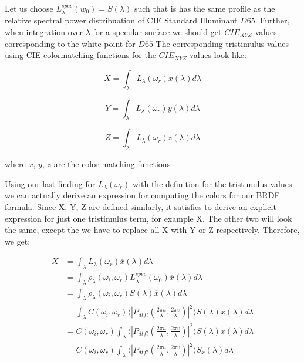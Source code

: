 Let us choose $L_\lambda^{spec}(w_0) = S(\lambda)$ such that is has the same profile as the relative spectral power distribuation of CIE Standard Illuminant $D65$. Further, when integration over $\lambda$ for a specular surface we should get $CIE_{XYZ}$ values corresponding to the white point for $D65$ 
The corresponding tristimulus values using CIE colormatching functions for the $CIE_{XYZ}$ values look like:

\begin{equation}
X = \int_{\lambda}L_\lambda(\omega_r)\overline{x}(\lambda)d\lambda
\end{equation} 

\begin{equation}
Y = \int_{\lambda}L_\lambda(\omega_r)\overline{y}(\lambda)d\lambda
\end{equation}

\begin{equation}
Z = \int_{\lambda}L_\lambda(\omega_r)\overline{z}(\lambda)d\lambda
\end{equation}

where $\overline{x}$, $\overline{y}$, $\overline{z}$ are the color matching functions

Using our last finding for $L_\lambda(\omega_r)$ with the definition for the tristimulus values we can actually derive an expression for computing the colors for our BRDF formula. 
Since X, Y, Z are defined similarly, it satisfies to derive an explicit expression for just one tristimulus term, for example X. The other two will look the same, except the we have to replace all X with Y or Z respectively. Therefore, we get:

\begin{align*}
X 
& =\int_{\lambda}L_\lambda(\omega_r)\overline{x}(\lambda)d\lambda \\
& =\int_{\lambda}\rho_\lambda(\omega_i,\omega_r)L_\lambda^{spec}(\omega_0) \overline{x}(\lambda)d\lambda \\
& =\int_{\lambda}\rho_\lambda(\omega_i,\omega_r) S(\lambda) \overline{x}(\lambda)d\lambda \\
& =\int_{\lambda} C(\omega_i,\omega_r) \langle \left|P_{dtft}(\frac{2\pi u}{\lambda}, \frac{2\pi v}{\lambda})\right|^2\rangle S(\lambda) \overline{x}(\lambda)d\lambda \\
& = C(\omega_i,\omega_r) \int_{\lambda} \langle \left|P_{dtft}(\frac{2\pi u}{\lambda}, \frac{2\pi v}{\lambda})\right|^2\rangle S(\lambda) \overline{x}(\lambda)d\lambda \\
& = C(\omega_i,\omega_r) \int_{\lambda} \langle \left|P_{dtft}(\frac{2\pi u}{\lambda}, \frac{2\pi v}{\lambda})\right|^2\rangle S_x(\lambda)d\lambda
\end{align*}

